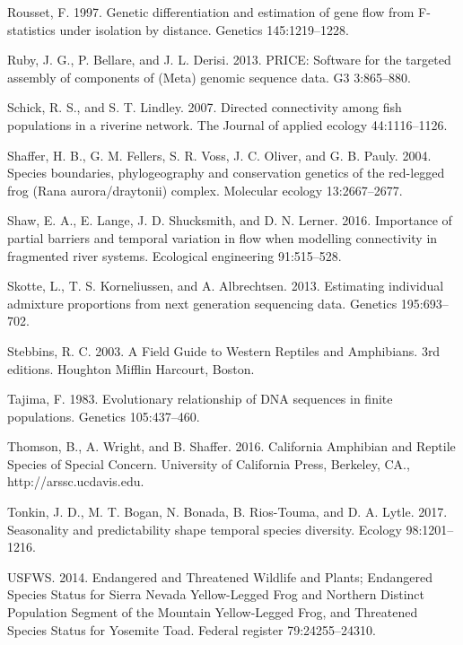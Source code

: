 \documentclass[twoside,12pt,final]{ucthesis-CA2012} %
\begin{document}
\begin{ucmainmatter}
\leavevmode\hypertarget{ref-rousset_genetic_1997}{}%
Rousset, F. 1997. Genetic differentiation and estimation of gene flow
from F-statistics under isolation by distance. Genetics 145:1219--1228.

\leavevmode\hypertarget{ref-ruby_price:_2013}{}%
Ruby, J. G., P. Bellare, and J. L. Derisi. 2013. PRICE: Software for the
targeted assembly of components of (Meta) genomic sequence data. G3
3:865--880.

\leavevmode\hypertarget{ref-schick_directed_2007}{}%
Schick, R. S., and S. T. Lindley. 2007. Directed connectivity among fish
populations in a riverine network. The Journal of applied ecology
44:1116--1126.

\leavevmode\hypertarget{ref-shaffer_species_2004}{}%
Shaffer, H. B., G. M. Fellers, S. R. Voss, J. C. Oliver, and G. B.
Pauly. 2004. Species boundaries, phylogeography and conservation
genetics of the red-legged frog (Rana aurora/draytonii) complex.
Molecular ecology 13:2667--2677.

\leavevmode\hypertarget{ref-shaw_importance_2016}{}%
Shaw, E. A., E. Lange, J. D. Shucksmith, and D. N. Lerner. 2016.
Importance of partial barriers and temporal variation in flow when
modelling connectivity in fragmented river systems. Ecological
engineering 91:515--528.

\leavevmode\hypertarget{ref-skotte_estimating_2013}{}%
Skotte, L., T. S. Korneliussen, and A. Albrechtsen. 2013. Estimating
individual admixture proportions from next generation sequencing data.
Genetics 195:693--702.

\leavevmode\hypertarget{ref-stebbins_field_2003}{}%
Stebbins, R. C. 2003. A Field Guide to Western Reptiles and Amphibians.
3rd editions. Houghton Mifflin Harcourt, Boston.

\leavevmode\hypertarget{ref-tajima_evolutionary_1983}{}%
Tajima, F. 1983. Evolutionary relationship of DNA sequences in finite
populations. Genetics 105:437--460.

\leavevmode\hypertarget{ref-thomson_california_2016}{}%
Thomson, B., A. Wright, and B. Shaffer. 2016. California Amphibian and
Reptile Species of Special Concern. University of California Press,
Berkeley, CA., http://arssc.ucdavis.edu.

\leavevmode\hypertarget{ref-tonkin_seasonality_2017}{}%
Tonkin, J. D., M. T. Bogan, N. Bonada, B. Rios-Touma, and D. A. Lytle.
2017. Seasonality and predictability shape temporal species diversity.
Ecology 98:1201--1216.

\leavevmode\hypertarget{ref-usfws_endangered_2014}{}%
USFWS. 2014. Endangered and Threatened Wildlife and Plants; Endangered
Species Status for Sierra Nevada Yellow-Legged Frog and Northern
Distinct Population Segment of the Mountain Yellow-Legged Frog, and
Threatened Species Status for Yosemite Toad. Federal register
79:24255--24310.


\end{ucmainmatter}
\end{document}
